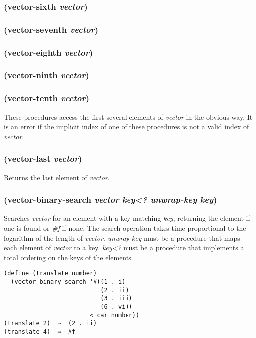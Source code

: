 \documentclass{article}
\begin{document}
\subsubsection{(vector-sixth \emph{vector})}

\subsubsection{(vector-seventh \emph{vector})}

\subsubsection{(vector-eighth \emph{vector})}

\subsubsection{(vector-ninth \emph{vector})}

\subsubsection{(vector-tenth \emph{vector})}

These procedures access the first several elements of \emph{vector} in the obvious way. It is
an error if the implicit index of one of these procedures is not a valid index of
\emph{vector}.

\subsubsection{(vector-last \emph{vector})}

Returns the last element of \emph{vector}.

\subsubsection{(vector-binary-search \emph{vector} \emph{key\textless{}?} \emph{unwrap-key} \emph{key})}

Searches \emph{vector} for an element with a key matching \emph{key}, returning the element if
one is found or \emph{\#f} if none. The search operation takes time proportional to the
logarithm of the length of \emph{vector}. \emph{unwrap-key} must be a procedure that maps each
element of \emph{vector} to a key. \emph{key\textless{}?} must be a procedure that implements
a total ordering on the keys of the elements.

\begin{verbatim}
(define (translate number)
  (vector-binary-search '#((1 . i)
                           (2 . ii)
                           (3 . iii)
                           (6 . vi))
                        < car number))
(translate 2)  ⇒  (2 . ii)
(translate 4)  ⇒  #f
\end{verbatim}
\end{document}
